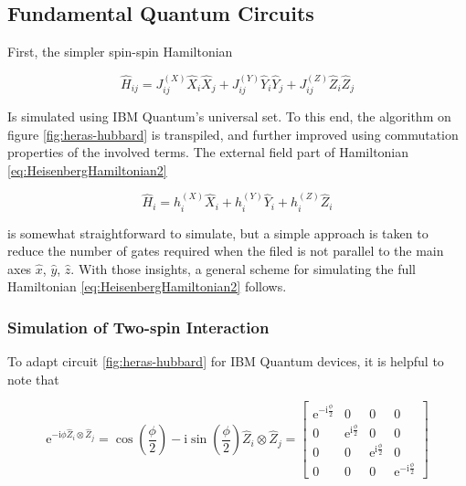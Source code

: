   \subsection{Fundamental Quantum Circuits}

  First, the simpler spin-spin Hamiltonian

  \begin{equation}
    \hat{H}_{ij} = J_{ij}^{(X)} \hat{X}_i \hat{X}_j + J_{ij}^{(Y)} \hat{Y}_i \hat{Y}_j + J_{ij}^{(Z)} \hat{Z}_i \hat{Z}_j
    \label{eq:SpinSpin}
  \end{equation}

  Is simulated using IBM Quantum's universal set. To this end, the algorithm on figure \ref{fig:heras-hubbard} is transpiled, and further improved using commutation properties of the involved terms. The external field part of Hamiltonian \ref{eq:HeisenbergHamiltonian2} 
  
  \begin{equation}
    \hat{H}_{i} = h_i^{(X)} \hat{X}_i + h_i^{(Y)} \hat{Y}_i + h_i^{(Z)} \hat{Z}_i
    \label{eq:FieldSpin}
  \end{equation}
  
  is somewhat straightforward to simulate, but a simple approach is taken to reduce the number of gates required when the filed is not parallel to the main axes $\hat{x}$, $\hat{y}$, $\hat{z}$. With those insights, a general scheme for simulating the full Hamiltonian \ref{eq:HeisenbergHamiltonian2} follows.

  \subsubsection{Simulation of Two-spin Interaction}

  To adapt circuit \ref{fig:heras-hubbard} for IBM Quantum devices, it is helpful to note that

  \begin{equation}
    \mathrm{e}^{-\mathrm{i}\phi \hat{Z}_i \otimes \hat{Z}_j} = \cos(\frac{\phi}{2}) - \mathrm{i}\sin(\frac{\phi}{2}) \hat{Z}_i \otimes \hat{Z}_j = 
    \begin{bmatrix}
      \mathrm{e}^{-\mathrm{i}\frac{\phi}{2}} & 0 & 0 & 0 \\
      0 & \mathrm{e}^{\mathrm{i}\frac{\phi}{2}} & 0 & 0 \\
      0 & 0 & \mathrm{e}^{\mathrm{i}\frac{\phi}{2}} & 0 \\
      0 & 0 & 0 & \mathrm{e}^{-\mathrm{i}\frac{\phi}{2}}
    \end{bmatrix}
    \label{eq:expZZ}
  \end{equation}

